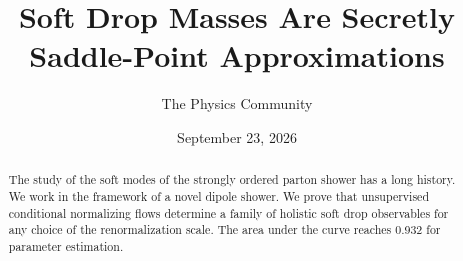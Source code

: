 \documentclass[11pt]{article}
\title{Soft Drop Masses Are Secretly Saddle-Point Approximations}
\author{The Physics Community}
\date{September 23, 2026}
\numberwithin{equation}{section}
\theoremstyle{definition}
\theoremstyle{remark}
\begin{document}
\maketitle
\begin{abstract}
The study of the soft modes of the strongly ordered parton shower has a
long history. We work in the framework of a novel dipole shower. We
prove that unsupervised conditional normalizing flows determine a family
of holistic soft drop observables for any choice of the renormalization
scale. The area under the curve reaches 0.932 for parameter estimation.
\end{abstract}
\tableofcontents





\nocite{*}


\end{document}
